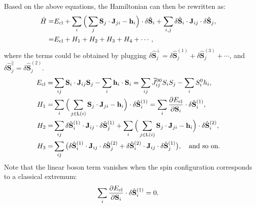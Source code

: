 \documentclass[aps, prx, nofootinbib, superscriptaddress]{revtex4-2}
\begin{document}
Based on the above equations, the Hamiltonian can then be rewritten as:
\begin{equation}
    \begin{split}
        \hat{H} = & E_{\rm cl}
        + \sum_{i} \Big( \sum_{j} \mathbf{S}_{j} \cdot \mathbf{J}_{ji} - \mathbf{h}_{i} \Big) \cdot \delta \hat{\mathbf{S}}_{i}
        + \sum_{i,j} \delta \hat{\mathbf{S}}_{i} \cdot \mathbf{J}_{ij} \cdot \delta \hat{\mathbf{S}}_{j}, \\
        = & E_{\rm cl} + H_{1} + H_{2} + H_{3} + H_{4} + \cdots,
    \end{split}
\end{equation}
where the terms could be obtained by plugging $\delta \hat{\mathbf{S}}_{j}^{\perp} = \delta \hat{\mathbf{S}}_{j}^{(1)} + \delta \hat{\mathbf{S}}_{j}^{(3)} + \cdots$, and $\delta \hat{\mathbf{S}}_{j}^{\parallel} = \delta \hat{\mathbf{S}}_{j}^{(2)}$.
\begin{equation}
    \begin{split}
        E_{\rm cl} 
        = & \sum_{ij} \mathbf{S}_i \cdot \mathbf{J}_{ij} \mathbf{S}_j - \sum_{i} \mathbf{h}_{i} \cdot \mathbf{S}_{i}
        = \sum_{ij}  \widetilde{J}_{ij}^{00} S_{i} S_{j} - \sum_{i} S_{i}^{0} h_{i}, \\
        H_{1} = & \sum_{i} \Big( \sum_{j \in \mathsf{L}(i)} \mathbf{S}_{j} \cdot \mathbf{J}_{ji} - \mathbf{h}_{i} \Big) \cdot \delta \hat{\mathbf{S}}_{i}^{(1)} 
        = \sum_{i} \frac{\partial E_{\rm cl}}{\partial \mathbf{S}_{i}} \cdot \delta \hat{\mathbf{S}}_{i}^{(1)}, \\
        H_{2} = & \sum_{ij} \delta \hat{\mathbf{S}}_{i}^{(1)} \cdot \mathbf{J}_{ij} \cdot \delta \hat{\mathbf{S}}_{j}^{(1)} 
        + \sum_{i} \Big( \sum_{j\in \mathsf{L}(i)} \mathbf{S}_{j} \cdot \mathbf{J}_{ji} - \mathbf{h}_{i} \Big) \cdot \delta \hat{\mathbf{S}}_{i}^{(2)}, \\
        H_{3} = & \sum_{ij} \big( \delta \hat{\mathbf{S}}_{i}^{(1)} \cdot \mathbf{J}_{ij} \cdot \delta \hat{\mathbf{S}}_{j}^{(2)} + \delta \hat{\mathbf{S}}_{i}^{(2)} \cdot \mathbf{J}_{ij} \cdot \delta \hat{\mathbf{S}}_{j}^{(1)} \big), 
        \quad \text{and so on.} 
    \end{split}
\end{equation}
Note that the linear boson term vanishes when the spin configuration corresponds to a classical extremum:
\begin{equation}
    \sum_{i} \frac{\partial E_{\rm cl}}{\partial \mathbf{S}_{i}} \cdot \delta \hat{\mathbf{S}}_{i}^{(1)} = 0.
\end{equation}
\end{document}
